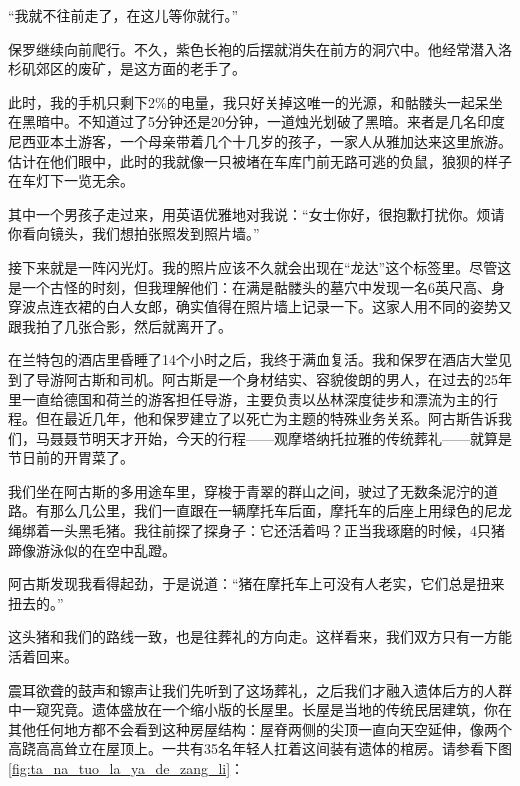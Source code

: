 \documentclass[12pt,oneside]{book}
\begin{document}
\begin{bookref}[frametitle={\cite{好好告别}}]
“我就不往前走了，在这儿等你就行。”

保罗继续向前爬行。不久，紫色长袍的后摆就消失在前方的洞穴中。他经常潜入洛杉矶郊区的废矿，是这方面的老手了。

此时，我的手机只剩下2\%的电量，我只好关掉这唯一的光源，和骷髅头一起呆坐在黑暗中。不知道过了5分钟还是20分钟，一道烛光划破了黑暗。来者是几名印度尼西亚本土游客，一个母亲带着几个十几岁的孩子，一家人从雅加达来这里旅游。估计在他们眼中，此时的我就像一只被堵在车库门前无路可逃的负鼠，狼狈的样子在车灯下一览无余。

其中一个男孩子走过来，用英语优雅地对我说：“女士你好，很抱歉打扰你。烦请你看向镜头，我们想拍张照发到照片墙。”

接下来就是一阵闪光灯。我的照片应该不久就会出现在“龙达”这个标签里。尽管这是一个古怪的时刻，但我理解他们：在满是骷髅头的墓穴中发现一名6英尺高、身穿波点连衣裙的白人女郎，确实值得在照片墙上记录一下。这家人用不同的姿势又跟我拍了几张合影，然后就离开了。

在兰特包的酒店里昏睡了14个小时之后，我终于满血复活。我和保罗在酒店大堂见到了导游阿古斯和司机。阿古斯是一个身材结实、容貌俊朗的男人，在过去的25年里一直给德国和荷兰的游客担任导游，主要负责以丛林深度徒步和漂流为主的行程。但在最近几年，他和保罗建立了以死亡为主题的特殊业务关系。阿古斯告诉我们，马聂聂节明天才开始，今天的行程——观摩塔纳托拉雅的传统葬礼——就算是节日前的开胃菜了。

我们坐在阿古斯的多用途车里，穿梭于青翠的群山之间，驶过了无数条泥泞的道路。有那么几公里，我们一直跟在一辆摩托车后面，摩托车的后座上用绿色的尼龙绳绑着一头黑毛猪。我往前探了探身子：它还活着吗？正当我琢磨的时候，4只猪蹄像游泳似的在空中乱蹬。

阿古斯发现我看得起劲，于是说道：“猪在摩托车上可没有人老实，它们总是扭来扭去的。”

这头猪和我们的路线一致，也是往葬礼的方向走。这样看来，我们双方只有一方能活着回来。

震耳欲聋的鼓声和镲声让我们先听到了这场葬礼，之后我们才融入遗体后方的人群中一窥究竟。遗体盛放在一个缩小版的长屋里。长屋是当地的传统民居建筑，你在其他任何地方都不会看到这种房屋结构：屋脊两侧的尖顶一直向天空延伸，像两个高跷高高耸立在屋顶上。一共有35名年轻人扛着这间装有遗体的棺房。请参看下图\ref{fig:ta_na_tuo_la_ya_de_zang_li}：


\end{bookref}
\end{document}
